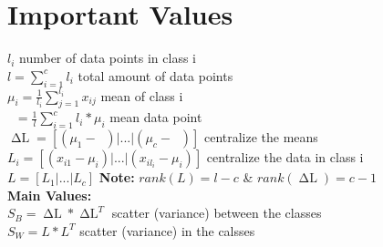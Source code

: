 \documentclass{article}
\DeclareMathOperator*{\hmu}{\hat{\mu}}
\DeclareMathOperator*{\dL}{\Delta L}
\begin{document}
\section*{Important Values}

$l_i$ number of data points in class i \\
$l = \sum_{i=1}^{c} l_i$ total amount of data points\\
$\mu_i = \frac{1}{l_i} \sum_{j=1}^{l_i} x_{ij}$ mean of class i\\
$\hmu = \frac{1}{l} \sum_{i = 1}^{c} l_i * \mu_i $ mean data point\\
$ \dL =  [(\mu_1 - \hmu) | ... | (\mu_c - \hmu)] $ centralize the means\\
$L_i = [(x_{i1} - \mu_i) | ... | (x_{il_i} - \mu_i)]$ centralize the data in class i\\
$L = [L_1 | ... | L_c]$ {\bfseries{ Note:}} $rank(L) = l - c$ \& $rank(\dL) = c - 1$\\
{\bfseries {Main Values: }}\\
$S_B = \dL * \dL^T$  scatter (variance) between the classes\\
$S_W =  L *  L^T$ scatter (variance) in the calsses 
\end{document}

